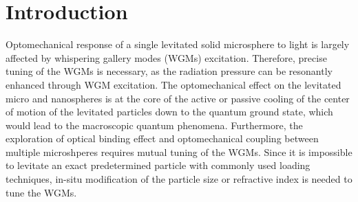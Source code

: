 \documentclass[aps,prl,preprint,groupedaddress]{revtex4-1}
\begin{document}
\maketitle


\section{Introduction}

Optomechanical response of a single levitated solid microsphere to light is largely affected by whispering gallery modes (WGMs) excitation\cite{ashkin_observation_1977}. Therefore, precise tuning of the WGMs is necessary, as the radiation pressure can be resonantly enhanced through WGM excitation\cite{barker_doppler_2010,li_cooling_2014,li_simultaneous_2016}. The optomechanical effect on the levitated micro and nanospheres is at the core of the active or passive cooling of the center of motion of the levitated particles\cite{romero-isart_toward_2010,chang_cavity_2010,li_millikelvin_2011,jain_direct_2016,vovrosh_controlling_2016} down to the quantum ground state, which would lead to the macroscopic quantum phenomena\cite{romero-isart_quantum_2011,rashid_experimental_2016}. Furthermore, the exploration of optical binding effect and optomechanical coupling between multiple microshperes\cite{ng_strong_2005,povinelli_high-q_2005,yang_spectroscopy_2009,arita_rotation_2015,kudo_optical_2016} requires mutual tuning of the WGMs. Since it is impossible to levitate an exact predetermined particle with commonly used loading techniques\cite{li_millikelvin_2011,neukirch_observation_2013,monteiro_dynamics_2013,minowa_optical_2015}, in-situ modification of the particle size or refractive index is needed to tune the WGMs.
\end{document}
